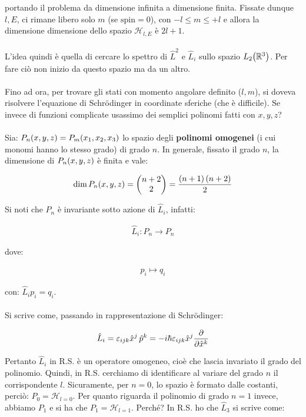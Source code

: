 	portando il problema da dimensione infinita a dimensione finita. Fissate dunque $l, E$, ci rimane libero solo $m$ (se $ \text{spin} = 0$), con $ - l \leq m \leq + l$ e allora la dimensione dimensione dello spazio $\mathcal{H}_{l, E}$ è $2 l + 1$.
	\\
	\\
	L'idea quindi è quella di cercare lo spettro di $\hat{L}^2$ e $\hat{L}_i$ sullo spazio $L_2\qty(\mathbb{R}^3)$. Per fare ciò non inizio da questo spazio ma da un altro.
	\\
	\\
	Fino ad ora, per trovare gli stati con momento angolare definito ($l, m$), si doveva risolvere l'equazione di Schrödinger in coordinate sferiche (che è difficile).
Se invece di funzioni complicate usassimo dei semplici polinomi fatti con $x, y, z$?
	\\
	\\
	Sia: $P_n \qty(x, y, z) = P_m \qty(x_1, x_2, x_3)$ lo spazio degli \textbf{polinomi omogenei} (i cui monomi hanno lo stesso grado) di grado $n$. In generale, fissato il grado $n$, la dimensione di $P_n\qty(x, y, z)$ è finita e vale:
	
\begin{align*}
	\text{dim} \, P_n \qty(x, y, z) = \mqty( n + 2 \\ 2 ) = \frac{\qty(n + 1) \, \qty(n + 2)}{2}
\end{align*} 

	Si noti che $P_n$ è invariante sotto azione di $\hat{L}_i$, infatti:
	
\begin{align*}
	\hat{L}_i : P_n \to P_n
\end{align*}
	
	dove:
	
\begin{align*}
	p_i \mapsto q_i
\end{align*}

	con: $\hat{L}_i p_i = q_i$.
	\\
	\\
	Si scrive come, passando in rappresentazione di Schr\"odinger:
	
\begin{align*}
	\hat{L}_i = \varepsilon_{i j k} \hat{x}^j \, \hat{p}^k = - i \hbar \varepsilon_{i j k} \hat{x}^j \pdv{}{\hat{x}^k}
\end{align*}

	Pertanto $\hat{L}_i$ in R.S. è un operatore omogeneo, cioè che lascia invariato il grado del polinomio. Quindi, in R.S. cerchiamo di identificare al variare del grado $n$ il corrispondente $l$. Sicuramente, per $n = 0$, lo spazio è formato dalle costanti, perciò: $P_0 = \mathcal{H}_{l = 0}$. Per quanto riguarda il polinomio di grado $n = 1$ invece, abbiamo $P_1$ e si ha che $P_1 = \mathcal{H}_{l = 1}$. Perché? In R.S. ho che $\hat{L}_3$ si scrive come:
	

